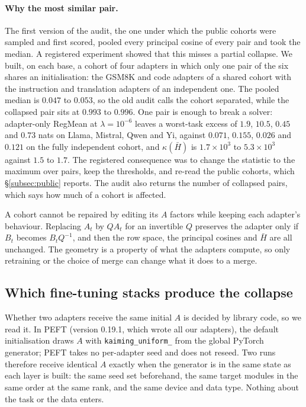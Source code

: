 \paragraph{Why the most similar pair.} The first version of the audit, the one
under which the public cohorts were sampled and first scored, pooled every
principal cosine of every pair and took the median. A registered experiment
showed that this misses a partial collapse. We built, on each base, a cohort
of four adapters in which only one pair of the six shares an initialisation:
the GSM8K and code adapters of a shared cohort with the instruction and
translation adapters of an independent one. The pooled median is $0.047$ to
$0.053$, so the old audit calls the cohort separated, while the collapsed pair
sits at $0.993$ to $0.996$. One pair is enough to break a solver: adapter-only
RegMean at $\lambda = 10^{-6}$ leaves a worst-task excess of $1.9$, $10.5$,
$0.45$ and $0.73$ nats on Llama, Mistral, Qwen and Yi, against $0.071$,
$0.155$, $0.026$ and $0.121$ on the fully independent cohort, and
$\kappa(\bar H)$ is $1.7\times10^{3}$ to $5.3\times10^{3}$ against $1.5$ to
$1.7$. The
registered consequence was to change the statistic to the maximum over pairs,
keep the thresholds, and re-read the public cohorts, which
\S\ref{subsec:public} reports. The audit also returns the number of collapsed
pairs, which says how much of a cohort is affected.

A cohort cannot be repaired by editing its $A$ factors while keeping each
adapter's behaviour. Replacing $A_t$ by $QA_t$ for an invertible $Q$ preserves
the adapter only if $B_t$ becomes $B_tQ^{-1}$, and then the row space, the
principal cosines and $\bar H$ are all unchanged. The geometry is a property of
what the adapters compute, so only retraining or the choice of merge can
change what it does to a merge.

\subsection{Which fine-tuning stacks produce the collapse}\label{subsec:libraries}

Whether two adapters receive the same initial $A$ is decided by library code,
so we read it. In PEFT (version 0.19.1, which wrote all our adapters), the
default initialisation draws $A$ with \texttt{kaiming\_uniform\_} from the
global PyTorch generator; PEFT takes no per-adapter seed and does not reseed.
Two runs therefore receive identical $A$ exactly when the generator is in the
same state as each layer is built: the same seed set beforehand, the same
target modules in the same order at the same rank, and the same device and
data type. Nothing about the task or the data enters.

